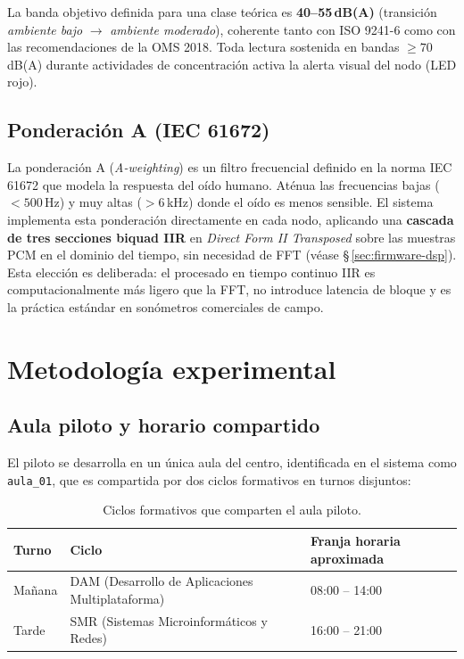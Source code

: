 \documentclass[11pt,a4paper,openany]{report}
\begin{document}
La banda objetivo definida para una clase te\'orica es \textbf{40--55\,dB(A)} (transici\'on \emph{ambiente bajo} $\rightarrow$ \emph{ambiente moderado}), coherente tanto con ISO 9241-6 como con las recomendaciones de la OMS 2018. Toda lectura sostenida en bandas $\geq 70$\,dB(A) durante actividades de concentraci\'on activa la alerta visual del nodo (LED rojo).

\section{Ponderaci\'on A (IEC 61672)}

La ponderaci\'on A (\emph{A-weighting}) es un filtro frecuencial definido en la norma IEC 61672 que modela la respuesta del o\'ido humano. At\'enua las frecuencias bajas ($<500$\,Hz) y muy altas ($>6$\,kHz) donde el o\'ido es menos sensible. El sistema implementa esta ponderaci\'on directamente en cada nodo, aplicando una \textbf{cascada de tres secciones biquad IIR} en \emph{Direct Form II Transposed} sobre las muestras PCM en el dominio del tiempo, sin necesidad de FFT (v\'ease \S\,\ref{sec:firmware-dsp}). Esta elecci\'on es deliberada: el procesado en tiempo continuo IIR es computacionalmente m\'as ligero que la FFT, no introduce latencia de bloque y es la pr\'actica est\'andar en son\'ometros comerciales de campo.

\chapter{Metodolog\'ia experimental}

\section{Aula piloto y horario compartido}

El piloto se desarrolla en un \'unica aula del centro, identificada en el sistema como \texttt{aula\_01}, que es compartida por dos ciclos formativos en turnos disjuntos:

\begin{table}[H]
\centering
{}
\begin{tabularx}{\textwidth}{l l X}
\toprule
\rowcolor{TableHead}
\textbf{Turno} & \textbf{Ciclo} & \textbf{Franja horaria aproximada} \\ \midrule
Ma\~nana & DAM (Desarrollo de Aplicaciones Multiplataforma) & 08:00 -- 14:00 \\
Tarde   & SMR (Sistemas Microinform\'aticos y Redes)        & 16:00 -- 21:00 \\ \bottomrule
\end{tabularx}
\caption{Ciclos formativos que comparten el aula piloto.}
\end{table}
\end{document}
